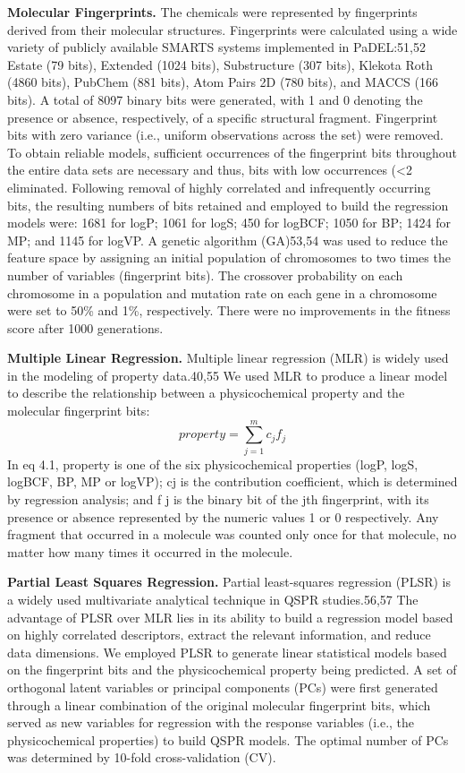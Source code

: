\documentclass[10pt, letter]{report}
\renewcommand{\=}{\, =\, }
\newcommand{\+}{\, +\, }
\renewcommand{\-}{\, -\, }
\begin{document}
\textbf{Molecular Fingerprints.} The chemicals were represented
by fingerprints derived from their molecular structures.
Fingerprints were calculated using a wide variety of publicly
available SMARTS systems implemented in PaDEL:51,52 Estate
(79 bits), Extended (1024 bits), Substructure (307 bits),
Klekota Roth (4860 bits), PubChem (881 bits), Atom Pairs 2D
(780 bits), and MACCS (166 bits). A total of 8097 binary bits
were generated, with 1 and 0 denoting the presence or absence,
respectively, of a specific structural fragment. Fingerprint bits
with zero variance (i.e., uniform observations across the set)
were removed. To obtain reliable models, sufficient occurrences
of the fingerprint bits throughout the entire data sets are
necessary and thus, bits with low occurrences (<2%
eliminated. Following removal of highly correlated and
infrequently occurring bits, the resulting numbers of bits
retained and employed to build the regression models were:
1681 for logP; 1061 for logS; 450 for logBCF; 1050 for BP;
1424 for MP; and 1145 for logVP. A genetic algorithm
(GA)53,54 was used to reduce the feature space by assigning an
initial population of chromosomes to two times the number of
variables (fingerprint bits). The crossover probability on each
chromosome in a population and mutation rate on each gene in
a chromosome were set to 50\% and 1\%, respectively. There
were no improvements in the fitness score after 1000
generations.

\textbf{Multiple Linear Regression.} Multiple linear regression
(MLR) is widely used in the modeling of property data.40,55 We
used MLR to produce a linear model to describe the
relationship between a physicochemical property and the
molecular fingerprint bits:
\begin{equation}
property = \sum_{j = 1}^{m}c_{j}f_{j}
\end{equation}
In eq 4.1, property is one of the six physicochemical properties
(logP, logS, logBCF, BP, MP or logVP); cj is the contribution
coefficient, which is determined by regression analysis; and f j is
the binary bit of the jth fingerprint, with its presence or absence
represented by the numeric values 1 or 0 respectively. Any
fragment that occurred in a molecule was counted only once for
that molecule, no matter how many times it occurred in the
molecule.

\textbf{Partial Least Squares Regression.} Partial least-squares
regression (PLSR) is a widely used multivariate analytical
technique in QSPR studies.56,57 The advantage of PLSR over
MLR lies in its ability to build a regression model based on
highly correlated descriptors, extract the relevant information,
and reduce data dimensions. We employed PLSR to generate
linear statistical models based on the fingerprint bits and the
physicochemical property being predicted. A set of orthogonal
latent variables or principal components (PCs) were first
generated through a linear combination of the original
molecular fingerprint bits, which served as new variables for
regression with the response variables (i.e., the physicochemical
properties) to build QSPR models. The optimal number of PCs
was determined by 10-fold cross-validation (CV).
\end{document}
